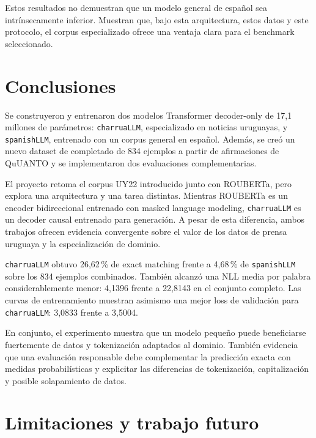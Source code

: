 \documentclass[11pt,a4paper]{article}
\newcommand{\charrua}{\texttt{charruaLLM}}
\newcommand{\spanishmodel}{\texttt{spanishLLM}}
\begin{document}
Estos resultados no demuestran que un modelo general de español sea
intrínsecamente inferior. Muestran que, bajo esta arquitectura, estos datos y
este protocolo, el corpus especializado ofrece una ventaja clara para el
benchmark seleccionado.


\section{Conclusiones}

Se construyeron y entrenaron dos modelos Transformer decoder-only de 17,1
millones de parámetros: \charrua, especializado en noticias uruguayas, y
\spanishmodel, entrenado con un corpus general en español. Además, se creó un
nuevo dataset de completado de 834 ejemplos a partir de afirmaciones de QuUANTO
y se implementaron dos evaluaciones complementarias.

El proyecto retoma el corpus UY22 introducido junto con ROUBERTa, pero explora
una arquitectura y una tarea distintas. Mientras ROUBERTa es un encoder
bidireccional entrenado con masked language modeling, \charrua{} es un decoder
causal entrenado para generación. A pesar de esta diferencia, ambos trabajos
ofrecen evidencia convergente sobre el valor de los datos de prensa uruguaya y
la especialización de dominio.

\charrua{} obtuvo 26,62\,\% de exact matching frente a 4,68\,\% de
\spanishmodel{} sobre los 834 ejemplos combinados. También alcanzó una NLL media por palabra considerablemente menor: 4,1396
frente a 22,8143 en el conjunto completo. Las curvas de entrenamiento muestran
asimismo una mejor loss de validación para \charrua: 3,0833 frente a 3,5004.

En conjunto, el experimento muestra que un modelo pequeño puede beneficiarse
fuertemente de datos y tokenización adaptados al dominio. También evidencia que
una evaluación responsable debe complementar la predicción exacta con medidas
probabilísticas y explicitar las diferencias de tokenización, capitalización y
posible solapamiento de datos.


\section{Limitaciones y trabajo futuro}
\end{document}
